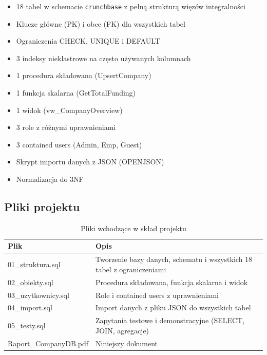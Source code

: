 \documentclass[12pt,a4paper]{article}
\begin{document}
\begin{itemize}[noitemsep]
    \item[$\checkmark$] 18 tabel w schemacie \texttt{crunchbase} z pełną strukturą więzów integralności
    \item[$\checkmark$] Klucze główne (PK) i obce (FK) dla wszystkich tabel
    \item[$\checkmark$] Ograniczenia CHECK, UNIQUE i DEFAULT
    \item[$\checkmark$] 3 indeksy nieklastrowe na często używanych kolumnach
    \item[$\checkmark$] 1 procedura składowana (UpsertCompany)
    \item[$\checkmark$] 1 funkcja skalarna (GetTotalFunding)
    \item[$\checkmark$] 1 widok (vw\_CompanyOverview)
    \item[$\checkmark$] 3 role z różnymi uprawnieniami
    \item[$\checkmark$] 3 contained users (Admin, Emp, Guest)
    \item[$\checkmark$] Skrypt importu danych z JSON (OPENJSON)
    \item[$\checkmark$] Normalizacja do 3NF
\end{itemize}

\subsection{Pliki projektu}

\begin{table}[H]
\centering
\caption{Pliki wchodzące w skład projektu}
\begin{tabular}{|l|p{9cm}|}
\hline
\textbf{Plik} & \textbf{Opis} \\
\hline
01\_struktura.sql & Tworzenie bazy danych, schematu i wszystkich 18 tabel z ograniczeniami \\
\hline
02\_obiekty.sql & Procedura składowana, funkcja skalarna i widok \\
\hline
03\_uzytkownicy.sql & Role i contained users z uprawnieniami \\
\hline
04\_import.sql & Import danych z pliku JSON do wszystkich tabel \\
\hline
05\_testy.sql & Zapytania testowe i demonstracyjne (SELECT, JOIN, agregacje) \\
\hline
Raport\_CompanyDB.pdf & Niniejszy dokument \\
\hline
\end{tabular}
\end{table}
\end{document}

